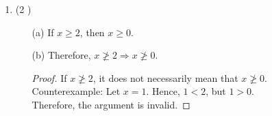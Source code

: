 \documentclass[11pt]{article}
\begin{document}
\begin{enumerate}
\begin{enumerate}
  \item (2 ) 
\begin{enumerate}
    \item[(a)] If $x \geq 2$, then $x \geq 0$.
    \item[(b)] Therefore, $x \ngeq 2 \Rightarrow x \ngeq 0$.\\
    \begin{proof}
    If $x \ngeq 2$, it does not necessarily mean that $x \ngeq 0$.\\
Counterexample: Let $x = 1$. Hence, $1 < 2$, but $1 > 0$.\\
Therefore, the argument is invalid.
\end{proof}
\end{enumerate}

  \end{enumerate}
\end{enumerate}
\end{document}
